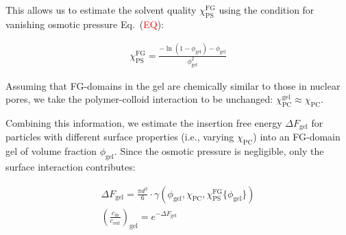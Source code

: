 \documentclass[10pt, a4paper]{article}
\newcommand\todo[1]{\textcolor{red}{#1}}
\begin{document}
\begin{multicols}{2}
This allows us to estimate the solvent quality $\chi_{\text{PS}}^{\text{FG}}$ using the condition for vanishing osmotic pressure Eq.~(\todo{EQ}):

\begin{eqnarray}
    \chi_{\text{PS}}^{\text{FG}} = \frac{-\ln(1-\phi_{\text{gel}}) - \phi_{\text{gel}}}{\phi_{\text{gel}}^2}
\end{eqnarray}

Assuming that FG-domains in the gel are chemically similar to those in nuclear pores, we take the polymer-colloid interaction to be unchanged: $\chi_{\text{PC}}^{\text{gel}} \approx \chi_{\text{PC}}$.

Combining this information, we estimate the insertion free energy $\Delta F_{\text{gel}}$ for particles with different surface properties (i.e., varying $\chi_{\text{PC}}$) into an FG-domain gel of volume fraction $\phi_{\text{gel}}$.
Since the osmotic pressure is negligible, only the surface interaction contributes:

\begin{eqnarray}
    \Delta F_{\text{gel}} =
    \frac{\pi d^3}{6} \cdot \gamma\left(
    \phi_{\text{gel}}, \chi_{\text{PC}},
    \chi_{\text{PS}}^{\text{FG}}\{ \phi_{\text{gel}} \}
    \right) \\
    \left(\frac{c_{\text{in}}}{c_{\text{out}}}\right)_{\text{gel}} = e^{-\Delta F_{\text{gel}}}
\end{eqnarray}

\end{multicols}
\pagebreak

\begin{table}[htp]
    \centering
        \caption{Transport-related quantities extracted from the experimental studies.}
        \label{tbl:experimental}
\end{table}
\end{document}
